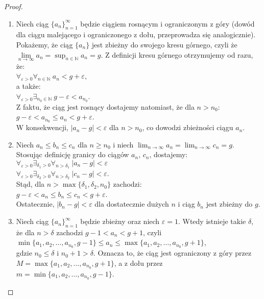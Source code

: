 \begin{proof}
\begin{enumerate}
\item Niech ciąg $\{a_n\}_{n=1}^{\infty}$ będzie ciągiem rosnącym i ograniczonym z góry (dowód dla ciągu malejącego i ograniczonego z dołu, przeprowadza się analogicznie). Pokażemy, że ciąg $\{a_n\}$ jest zbieżny do swojego kresu górnego, czyli że $\lim\limits_{n\to \infty}{a_n}=\sup_{n\in \mathbb{N}}{a_n}=g$. Z definicji kresu górnego otrzymujemy od razu, że:\\
 $\forall_{\varepsilon >0}\forall_{n\in \mathbb{N}}\ a_n<g+\varepsilon$,\\
  a także:\\
   $\forall_{\varepsilon >0}\exists_{n_0\in \mathbb{N}}\ g-\varepsilon <a_{n_0}$.\\
 Z faktu, że ciąg jest rosnący dostajemy natomiast, że dla $n>n_0$:\\
  $g-\varepsilon<a_{n_0}\leq a_n < g+ \varepsilon$. \\
  W konsekwencji, $|a_n-g|<\varepsilon$ dla $n>n_0$, co dowodzi zbieżności ciągu $a_n$.
\item Niech $a_n\leq b_n\leq c_n$ dla $n\geq n_0$ i niech $\lim_{n \to \infty}{a_n}=\lim_{n \to \infty}{c_n}=g$.\\
Stosując definicję granicy do ciągów $a_n$, $c_n$, dostajemy:\\
$\forall_{\varepsilon>0}\exists_{\delta_1>0}\forall_{n>\delta_1}\ |a_n-g|<\varepsilon$ \\ $\forall_{\varepsilon>0}\exists_{\delta_2>0}\forall_{n>\delta_2}\ |c_n-g|<\varepsilon$. \\
Stąd, dla $n>\max\{\delta_1,\delta_2, n_0\}$ zachodzi:\\
 $g-\varepsilon < a_n \leq b_n \leq c_n< g+ \varepsilon$.\\
 Ostatecznie, $|b_n-g|<\varepsilon$ dla dostatecznie dużych $n$ i ciąg $b_n$ jest zbieżny do $g$.
\item Niech ciąg $\{a_n\}_{n=1}^{\infty}$ będzie zbieżny oraz niech $\varepsilon =1$. Wtedy istnieje takie $\delta$, że dla $n>\delta$ zachodzi $g-1<a_n<g+1$, czyli\\
$\min\{a_1,a_2,\dots ,a_{n_0},g-1\}\leq a_n\leq \max\{a_1,a_2,\dots ,a_{n_0}, g+1\}$,\\
 gdzie $n_0\leq \delta$ i $n_0+1>\delta$. Oznacza to, że ciąg jest ograniczony z góry przez $M=\max\{a_1,a_2,\dots ,a_{n_0}, g+1\}$, a z dołu przez \\ $m=\min\{a_1,a_2,\dots ,a_{n_0},g-1\}$.
\end{enumerate}
\end{proof}
